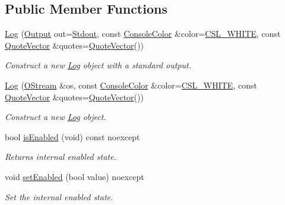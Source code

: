 \subsection*{Public Member Functions}
\begin{DoxyCompactItemize}
\item 
\mbox{\hyperlink{classo_a_1_1_log_a8f57798a38bc53782107ee07f2f2caa5}{Log}} (\mbox{\hyperlink{classo_a_1_1_log_a640171dc239ea7befcd640362343f88f}{Output}} out=\mbox{\hyperlink{classo_a_1_1_log_a640171dc239ea7befcd640362343f88fa6504dea4a3bf34c8734b664b6364a0d9}{Stdout}}, const \mbox{\hyperlink{namespaceo_a_a747e07c1977a29f3e1d38683043ec927}{Console\+Color}} \&color=\mbox{\hyperlink{namespaceo_a_a4afb55957ed6dcda70e81d6dd8f07885}{C\+S\+L\+\_\+\+W\+H\+I\+TE}}, const \mbox{\hyperlink{namespaceo_a_a38695044d9ec0b57190f4e3fab0caffd}{Quote\+Vector}} \&quotes=\mbox{\hyperlink{namespaceo_a_a38695044d9ec0b57190f4e3fab0caffd}{Quote\+Vector}}())
\begin{DoxyCompactList}\small\item\em Construct a new \mbox{\hyperlink{classo_a_1_1_log}{Log}} object with a standard output. \end{DoxyCompactList}\item 
\mbox{\hyperlink{classo_a_1_1_log_a69d8bda8bb1a902606866c757df8c018}{Log}} (\mbox{\hyperlink{namespaceo_a_ab69b2110953f22401259db9c6ddc7905}{O\+Stream}} \&os, const \mbox{\hyperlink{namespaceo_a_a747e07c1977a29f3e1d38683043ec927}{Console\+Color}} \&color=\mbox{\hyperlink{namespaceo_a_a4afb55957ed6dcda70e81d6dd8f07885}{C\+S\+L\+\_\+\+W\+H\+I\+TE}}, const \mbox{\hyperlink{namespaceo_a_a38695044d9ec0b57190f4e3fab0caffd}{Quote\+Vector}} \&quotes=\mbox{\hyperlink{namespaceo_a_a38695044d9ec0b57190f4e3fab0caffd}{Quote\+Vector}}())
\begin{DoxyCompactList}\small\item\em Construct a new \mbox{\hyperlink{classo_a_1_1_log}{Log}} object. \end{DoxyCompactList}\item 
bool \mbox{\hyperlink{classo_a_1_1_log_ada21589725c48f82d05893e5936522ea}{is\+Enabled}} (void) const noexcept
\begin{DoxyCompactList}\small\item\em Returns internal enabled state. \end{DoxyCompactList}\item 
void \mbox{\hyperlink{classo_a_1_1_log_a7c4699ea7ad0c8b910b4a3fc57ba5afe}{set\+Enabled}} (bool value) noexcept
\begin{DoxyCompactList}\small\item\em Set the internal enabled state. \end{DoxyCompactList}\item 

\end{DoxyCompactItemize}
